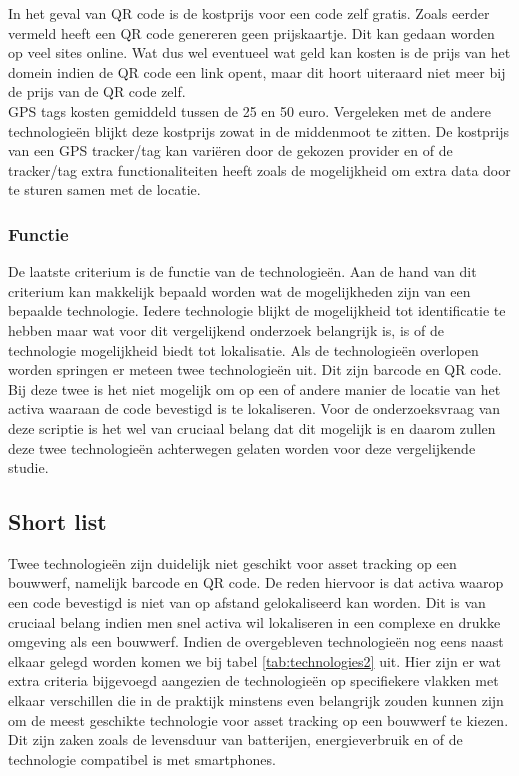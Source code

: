 In het geval van QR code is de kostprijs voor een code zelf gratis. Zoals eerder vermeld heeft een QR code genereren geen prijskaartje. Dit kan gedaan worden op veel sites online. Wat dus wel eventueel wat geld kan kosten is de prijs van het domein indien de QR code een link opent, maar dit hoort uiteraard niet meer bij de prijs van de QR code zelf. \\

GPS tags kosten gemiddeld tussen de 25 en 50 euro. Vergeleken met de andere technologieën blijkt deze kostprijs zowat in de middenmoot te zitten. De kostprijs van een GPS tracker/tag kan variëren door de gekozen provider en of de tracker/tag extra functionaliteiten heeft zoals de mogelijkheid om extra data door te sturen samen met de locatie.

\subsubsection{Functie}
De laatste criterium is de functie van de technologieën. Aan de hand van dit criterium kan makkelijk bepaald worden wat de mogelijkheden zijn van een bepaalde technologie. Iedere technologie blijkt de mogelijkheid tot identificatie te hebben maar wat voor dit vergelijkend onderzoek belangrijk is, is of de technologie mogelijkheid biedt tot lokalisatie. Als de technologieën overlopen worden springen er meteen twee technologieën uit. Dit zijn barcode en QR code. Bij deze twee is het niet mogelijk om op een of andere manier de locatie van het activa waaraan de code bevestigd is te lokaliseren. Voor de onderzoeksvraag van deze scriptie is het wel van cruciaal belang dat dit mogelijk is en daarom zullen deze twee technologieën achterwegen gelaten worden voor deze vergelijkende studie.\\

\subsection{Short list}
Twee technologieën zijn duidelijk niet geschikt voor asset tracking op een bouwwerf, namelijk barcode en QR code. De reden hiervoor is dat activa waarop een code bevestigd is niet van op afstand gelokaliseerd kan worden. Dit is van cruciaal belang indien men snel activa wil lokaliseren in een complexe en drukke omgeving als een bouwwerf. Indien de overgebleven technologieën nog eens naast elkaar gelegd worden komen we bij tabel \ref{tab:technologies2} uit. Hier zijn er wat extra criteria bijgevoegd aangezien de technologieën op specifiekere vlakken met elkaar verschillen die in de praktijk minstens even belangrijk zouden kunnen zijn om de meest geschikte technologie voor asset tracking op een bouwwerf te kiezen. Dit zijn zaken zoals de levensduur van batterijen, energieverbruik en of de technologie compatibel is met smartphones.

